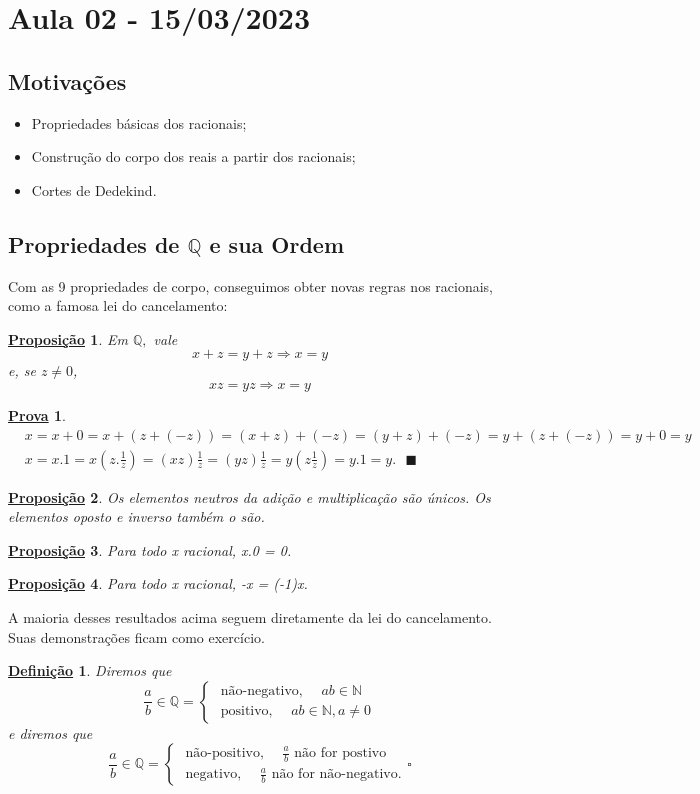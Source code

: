 \documentclass{article}
\newtheorem*{def*}{\underline{Defini\c c\~ao}}
\newtheorem*{prop*}{\underline{Proposi\c c\~ao}}
\newtheorem*{proof*}{\underline{Prova}}
\renewcommand\qedsymbol{$\blacksquare$}
\begin{document}
\section{Aula 02 - 15/03/2023}
\subsection{Motiva\c c\~oes}
\begin{itemize}
  \item Propriedades b\'asicas dos racionais;
  \item Constru\c c\~ao do corpo dos reais a partir dos racionais;
  \item Cortes de Dedekind.
\end{itemize}
\subsection{Propriedades de $\mathbb{Q}$ e sua Ordem}
  Com as 9 propriedades de corpo, conseguimos obter novas regras nos racionais, como a famosa lei do cancelamento:
 \begin{prop*}
   Em $\mathbb{Q},$ vale
   $$
    x + z = y + z \Rightarrow x = y
   $$
   e, se $z\neq{0}$,
   $$
    xz = yz \Rightarrow x = y 
   $$
 \end{prop*}
 \begin{proof*}
   \begin{align*}
   &x = x + 0 = x + (z + (-z)) = (x+z) + (-z) = (y + z) + (-z) = y + (z + (-z)) = y +0 = y\\
   &x = x.1 = x(z.\frac{1}{z}) = (xz)\frac{1}{z} = (yz)\frac{1}{z} = y (z \frac{1}{z}) = y.1 = y. \text{ \qedsymbol}
 \end{align*}
 \end{proof*}
 \begin{prop*}
  Os elementos neutros da adi\c c\~ao e multiplica\c c\~ao s\~ao \'unicos. Os elementos oposto e inverso tamb\'em o s\~ao.
 \end{prop*}
 \begin{prop*}
   Para todo x racional, x.0 = 0.
 \end{prop*}
 \begin{prop*}
   Para todo x racional, -x = (-1)x.
 \end{prop*}
 A maioria desses resultados acima seguem diretamente da lei do cancelamento. Suas demonstra\c c\~oes ficam como exerc\'icio.
\begin{def*}
  Diremos que 
  $$
    \frac{a}{b}\in \mathbb{Q} = \left\{\begin{array}{ll}
        \text{ n\~ao-negativo, } \quad ab\in \mathbb{N}\\
        \text{ positivo, } \quad ab\in \mathbb{N}, a\neq 0
      \end{array}\right.
  $$
  e diremos que 
  $$
    \frac{a}{b}\in \mathbb{Q} = \left\{\begin{array}{ll}
        \text{ n\~ao-positivo, } \quad \frac{a}{b} \text{ n\~ao for postivo}\\
        \text{ negativo, } \quad \frac{a}{b} \text{ n\~ao for n\~ao-negativo.}
      \end{array}\right.\square
  $$
\end{def*}
\end{document}
